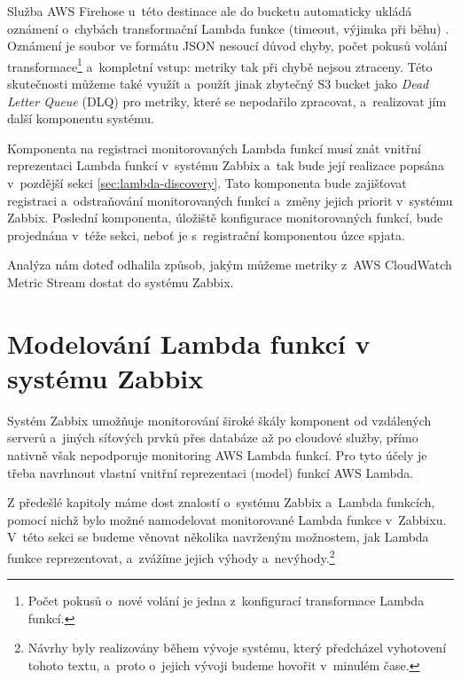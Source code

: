 \documentclass[czech, ing, kiv, he, iso690]{fasthesis}
\begin{document}
Služba AWS Firehose u~této destinace ale do bucketu automaticky ukládá oznámení o~chybách transformační Lambda funkce (timeout, výjimka při běhu) \cite{firehose.docs.aws}. Oznámení je soubor ve formátu JSON nesoucí důvod chyby, počet pokusů volání transformace\footnote{Počet pokusů o~nové volání je jedna z~konfigurací transformace Lambda funkcí.} a~kompletní vstup: metriky tak při chybě nejsou ztraceny. Této skutečnosti můžeme také využít a~použít jinak zbytečný S3 bucket jako \emph{Dead Letter Queue} (DLQ) pro metriky, které se nepodařilo zpracovat, a~realizovat jím další komponentu systému.

Komponenta na registraci monitorovaných Lambda funkcí musí znát vnitřní reprezentaci Lambda funkcí v~systému Zabbix a~tak bude její realizace popsána v~pozdější sekci \ref{sec:lambda-discovery}. Tato komponenta bude zajišťovat registraci a~odstraňování monitorovaných funkcí a~změny jejich priorit v~systému Zabbix. Poslední komponenta, úložiště konfigurace monitorovaných funkcí, bude projednána v~téže sekci, neboť je s~registrační komponentou úzce spjata.

Analýza nám doteď odhalila způsob, jakým můžeme metriky z~AWS CloudWatch Metric Stream dostat do systému Zabbix.

\section{Modelování Lambda funkcí v systému Zabbix}
\label{sec:modelovani-lambda-funkci}
Systém Zabbix umožňuje monitorování široké škály komponent od vzdálených serverů a~jiných síťových prvků přes databáze až po cloudové služby, přímo nativně však nepodporuje monitoring AWS Lambda funkcí. Pro tyto účely je třeba navrhnout vlastní vnitřní reprezentaci (model) funkcí AWS Lambda.

Z předešlé kapitoly máme dost znalostí o~systému Zabbix a~Lambda funkcích, pomocí nichž bylo možné namodelovat monitorované Lambda funkce v~Zabbixu. V~této sekci se budeme věnovat několika navrženým možnostem, jak Lambda funkce reprezentovat, a~zvážíme jejich výhody a~nevýhody.\footnote{Návrhy byly realizovány během vývoje systému, který předcházel vyhotovení tohoto textu, a~proto o~jejich vývoji budeme hovořit v~minulém čase.}
\end{document}
